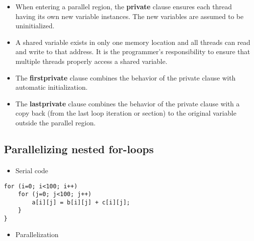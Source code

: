 \documentclass[%
oneside,                 %
final,                   %
10pt]{article}
\begin{document}
\begin{itemize}
\item When entering a parallel region, the \textbf{private} clause ensures each thread having its own new variable instances. The new variables are assumed to be uninitialized.

\item A shared variable exists in only one memory location and all threads can read and write to that address. It is the programmer's responsibility to ensure that multiple threads properly access a shared variable.

\item The \textbf{firstprivate} clause combines the behavior of the private clause with automatic initialization.

\item The \textbf{lastprivate} clause combines the behavior of the private clause with a copy back (from the last loop iteration or section) to the original variable outside the parallel region.
\end{itemize}

\noindent



\subsection*{Parallelizing nested for-loops}

\paragraph{}

\begin{itemize}
 \item Serial code
\end{itemize}

\noindent






\begin{verbatim}
for (i=0; i<100; i++)
    for (j=0; j<100; j++)
        a[i][j] = b[i][j] + c[i][j];
    }
}

\end{verbatim}


\begin{itemize}
\item Parallelization
\end{itemize}
\end{document}
